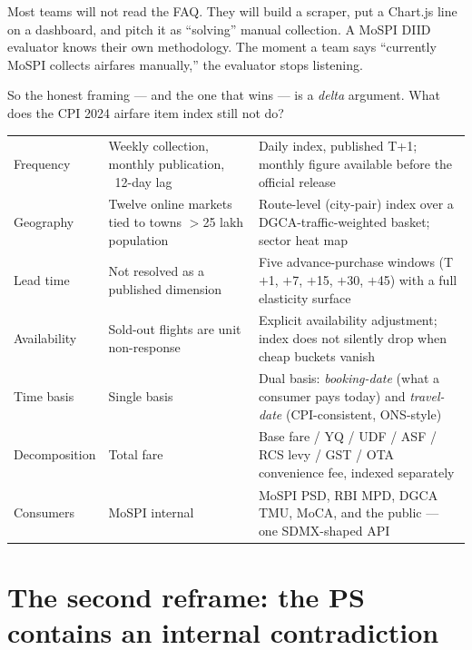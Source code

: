 \noindent Most teams will not read the FAQ. They will build a scraper, put a Chart.js line
on a dashboard, and pitch it as ``solving'' manual collection. A MoSPI DIID evaluator
knows their own methodology. The moment a team says ``currently MoSPI collects airfares
manually,'' the evaluator stops listening.

So the honest framing --- and the one that wins --- is a \emph{delta} argument. What does
the CPI 2024 airfare item index still not do?

\begin{center}
\small
\begin{tabularx}{\textwidth}{@{}L{4.6cm} L{5.0cm} X@{}}
\toprule
{} &  &  \\
\midrule
Frequency & Weekly collection, monthly publication, ~12-day lag & Daily index, published T+1; monthly figure available before the official release \\
\addlinespace[2pt]
Geography & Twelve online markets tied to towns $>$25 lakh population & Route-level (city-pair) index over a DGCA-traffic-weighted basket; sector heat map \\
\addlinespace[2pt]
Lead time & Not resolved as a published dimension & Five advance-purchase windows (T$+$1, $+$7, $+$15, $+$30, $+$45) with a full elasticity surface \\
\addlinespace[2pt]
Availability & Sold-out flights are unit non-response & Explicit availability adjustment; index does not silently drop when cheap buckets vanish \\
\addlinespace[2pt]
Time basis & Single basis & Dual basis: \emph{booking-date} (what a consumer pays today) and \emph{travel-date} (CPI-consistent, ONS-style) \\
\addlinespace[2pt]
Decomposition & Total fare & Base fare / YQ / UDF / ASF / RCS levy / GST / OTA convenience fee, indexed separately \\
\addlinespace[2pt]
Consumers & MoSPI internal & MoSPI PSD, RBI MPD, DGCA TMU, MoCA, and the public --- one SDMX-shaped API \\
\bottomrule
\end{tabularx}
\end{center}

\section{The second reframe: the PS contains an internal contradiction}

